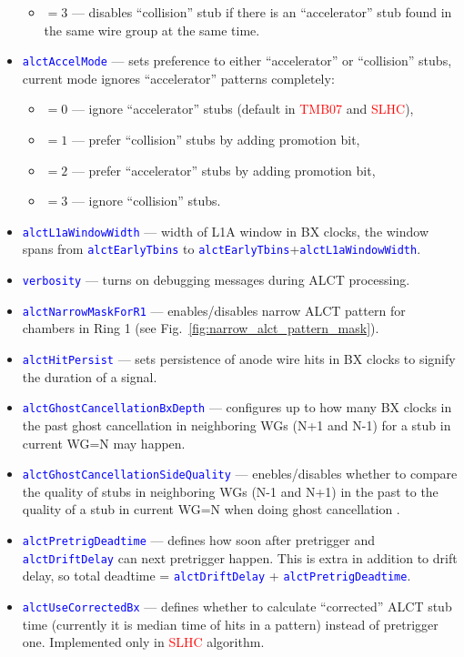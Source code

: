 \begin{itemize}
\begin{itemize}
    \item $=3$ --- disables ``collision'' stub if there is an ``accelerator'' stub found in the same wire group at the same time.
  \end{itemize}
  \item \textcolor{blue}{\texttt{alctAccelMode}} --- sets preference to either ``accelerator'' or ``collision'' stubs, current mode ignores ``accelerator'' patterns completely:
  \begin{itemize}
      \item $=0$ --- ignore ``accelerator'' stubs (default in \textcolor{red}{TMB07} and \textcolor{red}{SLHC}),
      \item $=1$ --- prefer ``collision'' stubs by adding promotion bit,
      \item $=2$ --- prefer ``accelerator'' stubs by adding promotion bit,
      \item $=3$ --- ignore ``collision'' stubs.
    \end{itemize}
  \item \textcolor{blue}{\texttt{alctL1aWindowWidth}} --- width of L1A window in BX clocks, the window spans from \textcolor{blue}{\texttt{alctEarlyTbins}} to \textcolor{blue}{\texttt{alctEarlyTbins}}+\textcolor{blue}{\texttt{alctL1aWindowWidth}}.
  \item \textcolor{blue}{\texttt{verbosity}} --- turns on debugging messages during ALCT processing.
  \item \textcolor{blue}{\texttt{alctNarrowMaskForR1}} --- enables/disables narrow ALCT pattern for chambers in Ring 1 (see Fig.~\ref{fig:narrow_alct_pattern_mask}).
  \item \textcolor{blue}{\texttt{alctHitPersist}} --- sets persistence of anode wire hits in BX clocks to signify the duration of a signal.
  \item \textcolor{blue}{\texttt{alctGhostCancellationBxDepth}} --- configures up to how many BX clocks in the past ghost cancellation in neighboring WGs (N+1 and N-1) for a stub in current WG=N may happen.
  \item \textcolor{blue}{\texttt{alctGhostCancellationSideQuality}} --- enebles/disables whether to compare the quality of stubs in neighboring WGs (N-1 and N+1) in the past to the quality of a stub in current WG=N when doing ghost cancellation .
  \item \textcolor{blue}{\texttt{alctPretrigDeadtime}} --- defines how soon after pretrigger and \textcolor{blue}{\texttt{alctDriftDelay}} can next pretrigger happen. This is extra in addition to drift delay, so total deadtime = \textcolor{blue}{\texttt{alctDriftDelay}} + \textcolor{blue}{\texttt{alctPretrigDeadtime}}.
  \item \textcolor{blue}{\texttt{alctUseCorrectedBx}} --- defines whether to calculate ``corrected'' ALCT stub time (currently it is median time of hits in a pattern) instead of pretrigger one. Implemented only in \textcolor{red}{SLHC} algorithm.
\end{itemize}

